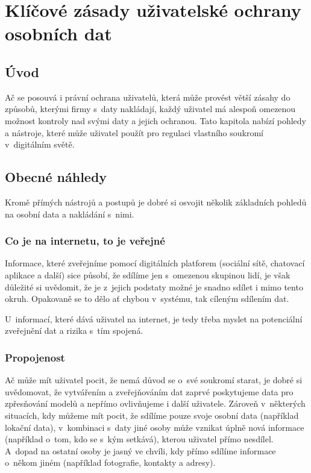 \chapter{Klíčové zásady uživatelské ochrany osobních dat}

\section*{Úvod}
Ač se posouvá i právní ochrana uživatelů, která může provést větší zásahy do způsobů, kterými firmy s~daty nakládají, každý uživatel má alespoň omezenou možnost kontroly nad svými daty a jejich ochranou.
Tato kapitola nabízí pohledy a nástroje, které může uživatel použít pro regulaci vlastního soukromí v~digitálním světě.

\section{Obecné náhledy}
Kromě přímých nástrojů a postupů je dobré si osvojit několik základních pohledů na osobní data a nakládání s~nimi.

\subsection{Co je na internetu, to je veřejné}
Informace, které zveřejníme pomocí digitálních platforem (sociální sítě, chatovací aplikace a další) sice působí, že sdílíme jen s~omezenou skupinou lidí, je však důležité si uvědomit, že je z~jejich podstaty možné je snadno sdílet i mimo tento okruh. Opakovaně se to dělo ať chybou v~systému, tak cíleným sdílením dat.

U~informací, které dává uživatel na internet, je tedy třeba myslet na potenciální zveřejnění dat a rizika s~tím spojená.


\subsection{Propojenost}
Ač může mít uživatel pocit, že nemá důvod se o~své soukromí starat, je dobré si uvědomovat, že vytvářením a zveřejňováním dat zaprvé poskytujeme data pro zpřesňování modelů a nepřímo ovlivňujeme i další uživatele. Zároveň v~některých situacích, kdy můžeme mít pocit, že sdílíme pouze svoje osobní data (například lokační data), v~kombinaci s~daty jiné osoby může vznikat úplně nová informace (například o~tom, kdo se s~kým setkává), kterou uživatel přímo nesdílel. A~dopad na ostatní osoby je jasný ve chvíli, kdy přímo sdílíme informace o~někom jiném (například fotografie, kontakty a adresy).  

